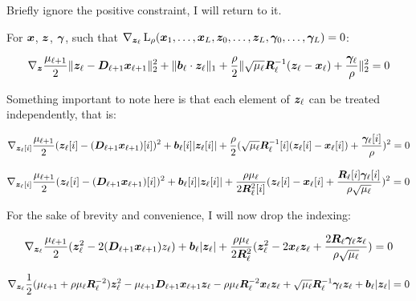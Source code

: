 \documentclass{article}
\begin{document}
Briefly ignore the positive constraint, I will return to it.

For $\bm{x}$, $\bm{z}$, $\bm{\gamma}$, such that $\nabla_{\bm{z}_{\ell}} \operatorname{L}_{\rho}(\bm{x}_1,\hdots,\bm{x}_L,\bm{z}_0,\hdots,\bm{z}_L,\bm{\gamma}_0,\hdots,\bm{\gamma}_L) = 0$:

\begin{equation}
\nabla_{\bm{z}} \frac{\mu_{\ell + 1}}{2}\|\bm{z}_{\ell} - \bm{D}_{\ell + 1}\bm{x}_{\ell + 1}\|_2^2 + \|\bm{b}_{\ell} \cdot \bm{z}_{\ell}\|_1 + \frac{\rho}{2} \|\sqrt{\mu_{\ell}}\bm{R}_{\ell}^{-1}(\bm{z}_{\ell} - \bm{x}_{\ell}) + \frac{\bm{\gamma}_{\ell}}{\rho}\|_2^2 = 0
\end{equation}

Something important to note here is that each element of $\bm{z}_{\ell}$ can be treated independently, that is:

\begin{equation}
\nabla_{\bm{z}_{\ell}[i]} \frac{\mu_{\ell + 1}}{2}(\bm{z}_{\ell}[i] - (\bm{D}_{\ell + 1}\bm{x}_{\ell + 1})[i])^2 + \bm{b}_{\ell}[i]|\bm{z}_{\ell}[i]| + \frac{\rho}{2} (\sqrt{\mu_{\ell}}\bm{R}_{\ell}^{-1}[i](\bm{z}_{\ell}[i] - \bm{x}_{\ell}[i]) + \frac{\bm{\gamma}_{\ell}[i]}{\rho})^2 = 0
\end{equation}


\begin{equation}
\nabla_{\bm{z}_{\ell}[i]} \frac{\mu_{\ell + 1}}{2}(\bm{z}_{\ell}[i] - (\bm{D}_{\ell + 1}\bm{x}_{\ell + 1})[i])^2 + \bm{b}_{\ell}[i]|\bm{z}_{\ell}[i]| + \frac{\rho\mu_{\ell}}{2\bm{R}_{\ell}^2[i]} (\bm{z}_{\ell}[i] - \bm{x}_{\ell}[i] + \frac{\bm{R}_{\ell}[i]\bm{\gamma}_{\ell}[i]}{\rho\sqrt{\mu_{\ell}}})^2 = 0
\end{equation}

For the sake of brevity and convenience, I will now drop the indexing:

\begin{equation}
\nabla_{\bm{z}_{\ell}} \frac{\mu_{\ell + 1}}{2}(\bm{z}_{\ell}^2 - 2(\bm{D}_{\ell + 1}\bm{x}_{\ell + 1})z_{\ell}) + \bm{b}_{\ell}|\bm{z}_{\ell}| + \frac{\rho\mu_{\ell}}{2\bm{R}_{\ell}^2} (\bm{z}_{\ell}^2 - 2\bm{x}_{\ell}\bm{z}_{\ell} + \frac{2\bm{R}_{\ell}\bm{\gamma}_{\ell}\bm{z}_{\ell}}{\rho\sqrt{\mu_{\ell}}}) = 0
\end{equation}

\begin{equation}
\nabla_{\bm{z}_{\ell}} \frac{1}{2}(\mu_{\ell + 1} + \rho\mu_{\ell}\bm{R}_{\ell}^{-2})\bm{z}_{\ell}^2 - \mu_{\ell + 1}\bm{D}_{\ell + 1}\bm{x}_{\ell + 1}\bm{z}_{\ell} - \rho\mu_{\ell}\bm{R}_{\ell}^{-2}\bm{x}_{\ell}\bm{z}_{\ell} + \sqrt{\mu_{\ell}}\bm{R}_{\ell}^{-1}\bm{\gamma}_{\ell}\bm{z}_{\ell} + \bm{b}_{\ell}|\bm{z}_{\ell}| = 0
\end{equation}
\end{document}
